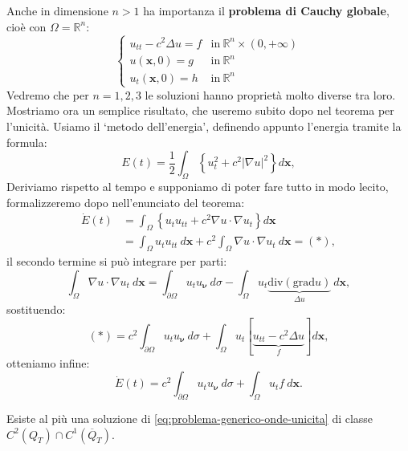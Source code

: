 \documentclass[10pt,a4paper,twoside,openright]{book}
\begin{document}
Anche in dimensione $n >1$ ha importanza il \textbf{problema di Cauchy globale}, cioè con $\Omega =\mathbb{R}^{n}$:
\begin{equation}
	\begin{cases}
		u_{tt} -c^{2} \Delta u=f & \text{in} \ \mathbb{R}^{n} \times ( 0,+\infty ) \\
		u(\mathbf{x} ,0) =g      & \text{in} \ \mathbb{R}^{n}                      \\
		u_{t}(\mathbf{x} ,0) =h  & \text{in} \ \mathbb{R}^{n}                      
	\end{cases}
	\label{eq:pcg-onde-unicita}
\end{equation}
Vedremo che per $n=1,2,3$ le soluzioni hanno proprietà molto diverse tra loro. Mostriamo ora un semplice risultato, che useremo subito dopo nel teorema per l'unicità. Usiamo il `metodo dell'energia', definendo appunto l'energia tramite la formula:
\begin{equation}
	E( t) =\frac{1}{2}\int _{\Omega }\left\{u_{t}^{2} +c^{2}| \nabla u| ^{2}\right\} d\mathbf{x} ,
\end{equation}
Deriviamo rispetto al tempo e supponiamo di poter fare tutto in modo lecito, formalizzeremo dopo nell'enunciato del teorema:
\begin{align*}
	\dot{E}( t) & =\int _{\Omega }\left\{u_{t} u_{tt} +c^{2} \nabla u\cdotp \nabla u_{t}\right\} d\mathbf{x}                          \\
	            & =\int _{\Omega } u_{t} u_{tt} \ d\mathbf{x} +c^{2}\int _{\Omega } \nabla u\cdotp \nabla u_{t} \ d\mathbf{x} =( *) , 
\end{align*}
il secondo termine si può integrare per parti:
\begin{equation*}
	\int _{\Omega } \nabla u\cdotp \nabla u_{t} \ d\mathbf{x} =\int _{\partial \Omega } u_{t} u_{\bm{\nu }} \ d\sigma -\int _{\Omega } u_{t}\underbrace{\mathrm{div}(\mathrm{grad} u)}_{\Delta u} \ d\mathbf{x} ,
\end{equation*}
sostituendo:
\begin{equation*}
	( *) =c^{2}\int _{\partial \Omega } u_{t} u_{\bm{\nu }} \ d\sigma +\int _{\Omega } u_{t}[\underbrace{u_{tt} -c^{2} \Delta u}_{f}] d\mathbf{x} ,
\end{equation*}
otteniamo infine:
\begin{equation}
	\dot{E}( t) =c^{2}\int _{\partial \Omega } u_{t} u_{\bm{\nu }} \ d\sigma +\int _{\Omega } u_{t} f\ d\mathbf{x} .
	\label{eq:onde-derivata-energia}
\end{equation}
\begin{theorem}
	Esiste al più una soluzione di \eqref{eq:problema-generico-onde-unicita} di classe $C^{2}( Q_{T}) \cap C^{1}(\overline{Q}_{T})$.
\end{theorem}
\end{document}
